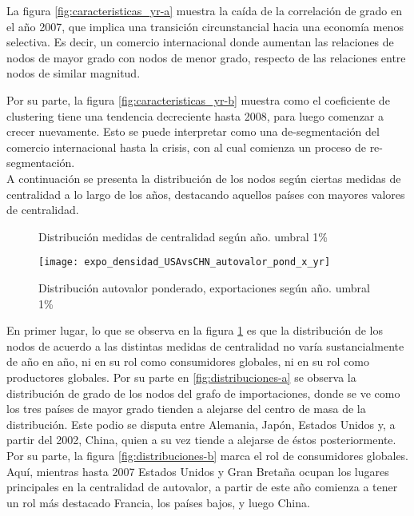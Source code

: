\documentclass[class=article, crop=false]{standalone}
\begin{document}
La figura \ref{fig:caracteristicas_yr-a} muestra la caída de la correlación de grado en el año 2007, que implica una transición circunstancial hacia una economía menos selectiva. Es decir, un comercio internacional donde aumentan las relaciones de nodos de mayor grado con nodos de menor grado, respecto de las relaciones entre nodos de similar magnitud.

Por su parte, la figura \ref{fig:caracteristicas_yr-b} muestra como el coeficiente de clustering tiene una tendencia decreciente hasta 2008, para luego comenzar a crecer nuevamente. Esto se puede interpretar como una de-segmentación del comercio internacional hasta la crisis, con al cual comienza un proceso de re-segmentación. \\

A continuación se presenta la distribución de los nodos según ciertas medidas de centralidad a lo largo de los años, destacando aquellos países con mayores valores de centralidad. 


\begin{figure}
\centering
{}


%    
\caption{Distribución medidas de centralidad según año. umbral 1\%}
\label{fig:distribuciones}
\end{figure}



\begin{figure}
	\centering		\texttt{[image: expo\_densidad\_USAvsCHN\_autovalor\_pond\_x\_yr]}
	\caption{Distribución autovalor ponderado, exportaciones según año. umbral 1\%}
	\label{fig:distribuciones-c}
\end{figure}




En primer lugar, lo que se observa en la figura \ref{fig:distribuciones} es que la distribución de los nodos de acuerdo a las distintas medidas de centralidad no varía sustancialmente de año en año, ni en su rol como consumidores globales, ni en su rol como productores globales. Por su parte en \ref{fig:distribuciones-a} se observa la distribución de grado de los nodos del grafo de importaciones, donde se ve como los tres países de mayor grado tienden a alejarse del centro de masa de la distribución. Este podio se disputa entre Alemania, Japón, Estados Unidos y, a partir del 2002, China, quien a su vez tiende a alejarse de éstos posteriormente. Por su parte, la figura \ref{fig:distribuciones-b} marca el rol de consumidores globales. Aquí, mientras hasta 2007 Estados Unidos y Gran Bretaña ocupan los lugares principales en la centralidad de autovalor, a partir de este año comienza a tener un rol más destacado Francia, los países bajos, y luego China.      
\end{document}
